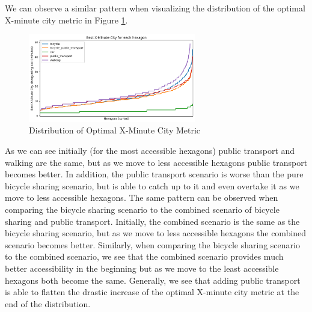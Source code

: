 We can observe a similar pattern when visualizing the distribution of the optimal X-minute city metric in Figure \ref{fig:optimal_x_minute_city_metric}.
\begin{figure}
  \begin{center}
    \includegraphics[width=0.65\textwidth]{Figures/results/minute_city_metric/best_x_minute_city}
  \end{center}
  \caption{Distribution of Optimal X-Minute City Metric}
  \label{fig:optimal_x_minute_city_metric}
\end{figure}
As we can see initially (for the most accessible hexagons) public transport and walking are the same, but as we move to less accessible hexagons public transport becomes better.
In addition, the public transport scenario is worse than the pure bicycle sharing scenario, but is able to catch up to it and even overtake it as we move to less accessible hexagons.
The same pattern can be observed when comparing the bicycle sharing scenario to the combined scenario of bicycle sharing and public transport.
Initially, the combined scenario is the same as the bicycle sharing scenario, but as we move to less accessible hexagons the combined scenario becomes better.
Similarly, when comparing the bicycle sharing scenario to the combined scenario, we see that the combined scenario provides much better accessibility in the beginning but as we move to the least accessible hexagons both become the same.
Generally, we see that adding public transport is able to flatten the drastic increase of the optimal X-minute city metric at the end of the distribution.


